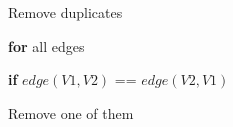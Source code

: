 \documentclass[../Head/Main.tex]{subfiles}
\begin{document}
\begin{Pseudo}{Remove duplicates}{}

 	\textbf{for} all edges 
 	
 	 \textbf{if} $edge(V1,V2)$ == $edge(V2,V1)$  
 	 	
	 Remove one of them

\end{Pseudo}
\end{document}
